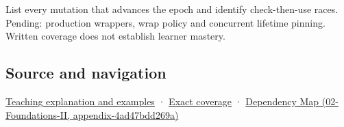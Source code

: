 List every mutation that advances the epoch and identify check-then-use races. Pending: production wrappers, wrap policy and concurrent lifetime pinning. Written coverage does not establish learner mastery.

\subsection{Source and navigation}\label{appendix-aa405b7c3903-source-and-navigation}

\hyperref[01-foundations-i-ch003-when-a-valid-borrow-stops-naming-the-intended-thing]{Teaching explanation and examples} · \hyperref[appendix-fd090d982a15-m008---parts-113-126]{Exact coverage} · \href{../02-Foundations-II/main.pdf\#nameddest=appendix-4ad47bdd269a}{Dependency Map (02-Foundations-II, appendix-4ad47bdd269a)}
